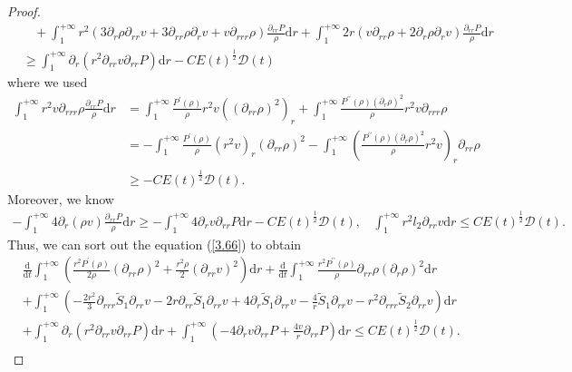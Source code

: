 \documentclass[10pt,reqno]{amsart}
\numberwithin{equation}{section}
\begin{document}
\begin{proof}
\begin{equation}
\begin{aligned}
				&~~~~+\int_{1}^{+\infty}r^2(3\partial_{r}\rho\partial_{rr}v+3\partial_{rr}\rho\partial_{r}v+v\partial_{rrr}\rho)\frac{\partial_{rr}P}{\rho} \mathrm{d}r+\int_{1}^{+\infty}2r(v\partial_{rr}\rho+2\partial_{r}\rho\partial_{r}v)\frac{\partial_{rr}P}{\rho} \mathrm{d}r\\
				&\geq \int_{1}^{+\infty}\partial_{r}(r^2 \partial_{rr}v\partial_{rr}P)\mathrm{d}r
				-C E(t)^{\frac{1}{2}}\mathcal{D}(t)
			\end{aligned}
		\end{equation}
		where we used
		\begin{equation}\nonumber
			\begin{aligned}
				\int_{1}^{+\infty}r^2v\partial_{rrr}\rho\frac{\partial_{rr}P}{\rho} \mathrm{d}r&=
				\int_{1}^{+\infty}\frac{P^\prime(\rho)}{\rho}r^2v((\partial_{rr}\rho)^2)_r
				+\int_{1}^{+\infty}\frac{P^{\prime\prime}(\rho)(\partial_{r}\rho)^2}{\rho}r^2v\partial_{rrr}\rho\\
				&=-\int_{1}^{+\infty}\frac{P^\prime(\rho)}{\rho}(r^2v)_r(\partial_{rr}\rho)^2
				-\int_{1}^{+\infty}(\frac{P^{\prime\prime}(\rho)(\partial_{r}\rho)^2}{\rho}r^2v)_r\partial_{rr}\rho\\
				&\geq-C E(t)^{\frac{1}{2}}\mathcal{D}(t).
			\end{aligned}
		\end{equation}
		Moreover, we know
		\begin{equation}\nonumber
			\begin{aligned}
				-\int_{1}^{+\infty}4\partial_{r} (\rho v) \frac{\partial_{rr}P}{\rho}\mathrm{d}r
				\geq -\int_{1}^{+\infty}4\partial_{r}v\partial_{rr}P\mathrm{d}r
				-C E(t)^{\frac{1}{2}}\mathcal{D}(t),
				~~~~\int_{1}^{+\infty}r^2l_2 \partial_{rr}v\mathrm{d}r
				\leq C E(t)^{\frac{1}{2}}\mathcal{D}(t).
			\end{aligned}
		\end{equation}
		Thus, we can sort out the equation (\ref{3.66}) to obtain
		\begin{equation}\label{72}
			\begin{aligned}
				&\frac{\mathrm{d}}{\mathrm{d} t}\int_{1}^{+\infty}\left(\frac{r^2 P^{\prime}(\rho)}{2\rho} \left(\partial_{rr} \rho\right)^2+\frac{r^2\rho}{2} (\partial_{rr}v)^2\right)\mathrm{d}r
				+\frac{\mathrm{d}}{\mathrm{d} t}\int_{1}^{+\infty}\frac{r^2 P^{\prime\prime}(\rho)}{\rho} \partial_{rr} \rho(\partial_{r}\rho)^2\mathrm{d}r\\
				&+\int_{1}^{+\infty}(-\frac{2 r^2}{3} \partial_{rrr}\tilde{S}_1 \partial_{rr}v-2r\partial_{rr}\tilde{S}_1\partial_{rr}v+4\partial_{r}\tilde{S}_1  \partial_{rr}v-\frac{4}{r}\tilde{S}_1\partial_{rr}v
				-r^2 \partial_{rrr}\tilde{S}_2 \partial_{rr}v)\mathrm{d}r\\
				&+\int_{1}^{+\infty}\partial_{r}(r^2 \partial_{rr}v\partial_{rr}P)\mathrm{d}r
				+\int_{1}^{+\infty}(-4\partial_{r}v\partial_{rr}P+\frac{4 v}{r}\partial_{rr}P)\mathrm{d}r
				\leq C E(t)^{\frac{1}{2}}\mathcal{D}(t).\\
			\end{aligned}
		\end{equation}
		

\end{proof}
\end{document}
